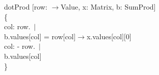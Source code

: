 \begin{myquote}
\Bpred dotProd [row: \Bint$\rightarrow$Value, x: Matrix, b: SumProd] \\
\{\\
\TA \Ball col: row.\Buniv\ $|$\\
\TB b.values[col] = row[col]$\rightarrow$x.values[col][0]\\
\TA \Ball col: \Bint - row.\Buniv\ $|$\\
\TB \Bno b.values[col]\\
\}
\end{myquote}